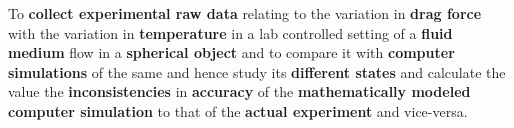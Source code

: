 {To \textbf{collect experimental raw data} relating to the variation in \textbf{drag force} with the variation in \textbf{temperature} in a lab controlled setting of a \textbf{fluid medium} flow in a \textbf{spherical object} and to compare it with \textbf{computer simulations} of the same and hence study its \textbf{different states} and calculate the value the \textbf{inconsistencies} in \textbf{accuracy} of the \textbf{mathematically modeled computer simulation} to that of the \textbf{actual experiment} and vice-versa.}
